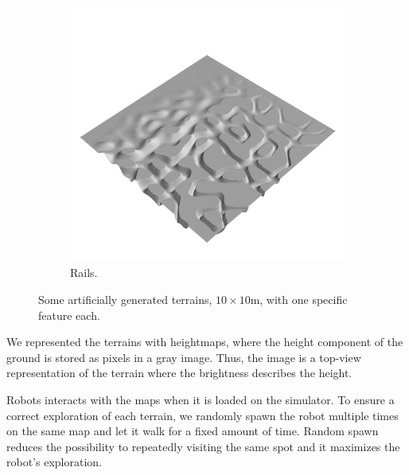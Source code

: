 \documentclass[../document.tex]{subfiles}
\begin{document}
\begin{figure}[htbp]
\begin{subfigure}[b]{0.24\textwidth}
 \end{subfigure}  
    \begin{subfigure}[b]{0.24\textwidth}
        \includegraphics[width=\linewidth]{../img/hm3d/rails3.png}
        \caption{Rails.}
    \end{subfigure}  
\caption{Some artificially generated terrains, $10\times 10$m, with one specific feature each. }   
\label{fig : grounds}
\end{figure}
We represented the terrains with heightmaps, where the height component of the ground is stored as pixels in a gray image. Thus, the image is a top-view representation of the terrain where the brightness describes the height. 

Robots interacts with the maps when it is loaded on the simulator. To ensure a correct exploration of each terrain, we randomly spawn the robot multiple times on the same map and let it walk for a fixed amount of time. Random spawn reduces the possibility to repeatedly visiting the same spot and it maximizes the robot's exploration.
\end{document}
